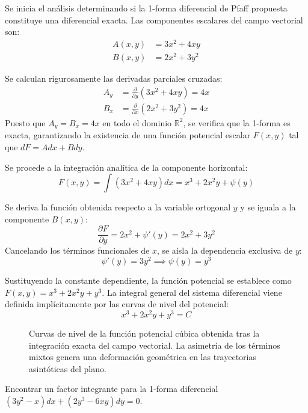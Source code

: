 \begin{tcolorbox}
Se inicia el análisis determinando si la 1-forma diferencial de Pfaff propuesta constituye una diferencial exacta. Las componentes escalares del campo vectorial son:
\begin{align*}
    A(x,y) &= 3x^2 + 4xy \\
    B(x,y) &= 2x^2 + 3y^2
\end{align*}

Se calculan rigurosamente las derivadas parciales cruzadas:
\begin{align*}
    A_y &= \frac{\partial}{\partial y}(3x^2 + 4xy) = 4x \\
    B_x &= \frac{\partial}{\partial x}(2x^2 + 3y^2) = 4x
\end{align*}
Puesto que $A_y = B_x = 4x$ en todo el dominio $\mathbb{R}^2$, se verifica que la 1-forma es exacta, garantizando la existencia de una función potencial escalar $F(x,y)$ tal que $dF = A dx + B dy$.

Se procede a la integración analítica de la componente horizontal:
$$ F(x,y) = \int (3x^2 + 4xy)dx = x^3 + 2x^2y + \psi(y) $$

Se deriva la función obtenida respecto a la variable ortogonal $y$ y se iguala a la componente $B(x,y)$:
$$ \frac{\partial F}{\partial y} = 2x^2 + \psi'(y) = 2x^2 + 3y^2 $$
Cancelando los términos funcionales de $x$, se aísla la dependencia exclusiva de $y$:
$$ \psi'(y) = 3y^2 \implies \psi(y) = y^3 $$

Sustituyendo la constante dependiente, la función potencial se establece como $F(x,y) = x^3 + 2x^2y + y^3$. La integral general del sistema diferencial viene definida implícitamente por las curvas de nivel del potencial:
$$ x^3 + 2x^2y + y^3 = C $$

\begin{figure}[H]
    \centering
    
    \caption{Curvas de nivel de la función potencial cúbica obtenida tras la integración exacta del campo vectorial. La asimetría de los términos mixtos genera una deformación geométrica en las trayectorias asintóticas del plano.}
\end{figure}
\end{tcolorbox}

\begin{ejercicio}
Encontrar un factor integrante para la 1-forma diferencial $(3y^2 - x)dx + (2y^3 - 6xy)dy = 0$.
\end{ejercicio}

